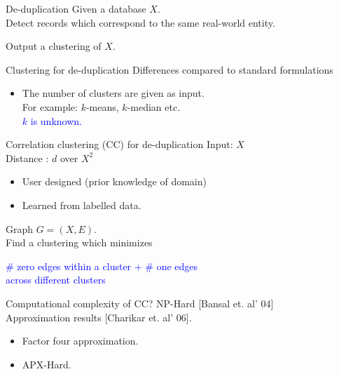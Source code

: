 \documentclass{beamer}
\begin{document}
\begin{frame}{De-duplication}
	\onslide<1->
    Given a database $X$. \\

    \vspace{10pt}\alert{Detect} records which correspond to the same real-world entity.
    
    \vspace{30pt}Output a clustering of $X$.
\end{frame}

\begin{frame}{Clustering for de-duplication}
	Differences compared to standard formulations\\
    \begin{itemize}
    	\vspace{10pt}\item The number of clusters are given as input. \\
    	For example: $k$-means, $k$-median etc.\\
    	\vspace{10pt}\textcolor{blue}{$k$ is unknown.}
	\end{itemize}    	
\end{frame}

\begin{frame}{Correlation clustering (CC) for de-duplication}
	Input: $X$\\
	Distance   : $d$ over $X^2$\\
	\begin{itemize}
		\item User designed (prior knowledge of domain) 
		\item Learned from labelled data.
	\end{itemize}
	 
	\vspace{20pt}Graph $G = (X, E)$. \\
    \vspace{10pt}Find a clustering which minimizes
    
    \begin{center}
    \textcolor{blue}{\# zero edges within a cluster + \# one edges\\ across different clusters}
    \end{center}
    
\end{frame}

\begin{frame}{Computational complexity of CC?}
	NP-Hard \alert{[Bansal et. al' 04]}\\
	
	\vspace{30pt}Approximation results \alert{[Charikar et. al' 06]}.
	\begin{itemize}
		\vspace{10pt}\item Factor four approximation. 
		\vspace{10pt}\item APX-Hard. 
 	\end{itemize}
\end{frame}
\end{document}
